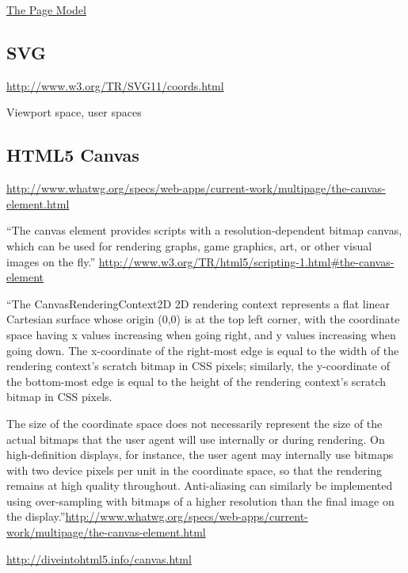 \documentclass[12pt]{tufte-handout}
\numberwithin{equation}{subsection}
\numberwithin{equation}{subsection}
\begin{document}
\begin{appendices}
                \href{http://www.w3.org/TR/css3-page/#page-model}{The Page Model}

                \subsection{SVG}

                \url{http://www.w3.org/TR/SVG11/coords.html}

                Viewport space, user spaces

                \subsection{HTML5 Canvas}
                \label{subs:html5}

                \url{http://www.whatwg.org/specs/web-apps/current-work/multipage/the-canvas-element.html}

                ``The canvas element provides scripts with a resolution-dependent bitmap canvas, which can be used for rendering graphs, game graphics, art, or other visual images on the fly.'' \url{http://www.w3.org/TR/html5/scripting-1.html#the-canvas-element}

                ``The CanvasRenderingContext2D 2D rendering context represents a flat linear Cartesian surface whose origin (0,0) is at the top left corner, with the coordinate space having x values increasing when going right, and y values increasing when going down. The x-coordinate of the right-most edge is equal to the width of the rendering context's scratch bitmap in CSS pixels; similarly, the y-coordinate of the bottom-most edge is equal to the height of the rendering context's scratch bitmap in CSS pixels.

                The size of the coordinate space does not necessarily represent the size of the actual bitmaps that the user agent will use internally or during rendering. On high-definition displays, for instance, the user agent may internally use bitmaps with two device pixels per unit in the coordinate space, so that the rendering remains at high quality throughout. Anti-aliasing can similarly be implemented using over-sampling with bitmaps of a higher resolution than the final image on the display.''\url{http://www.whatwg.org/specs/web-apps/current-work/multipage/the-canvas-element.html}

                \url{http://diveintohtml5.info/canvas.html}


\end{appendices}
\end{document}

